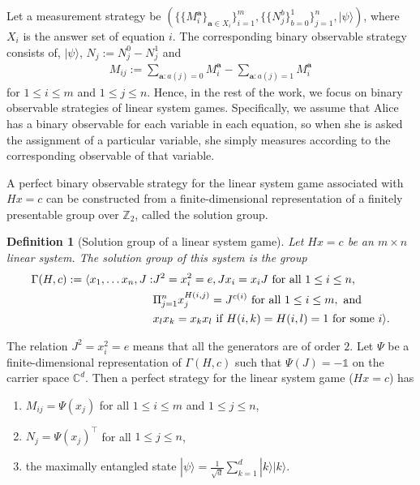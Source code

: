 \documentclass[11pt,letterpaper]{article}
\newcommand{\ket}[1]{|#1\rangle}
\newcommand{\tp}{^\intercal}
\DeclarePairedDelimiter{\ip}{\langle}{\rangle}
\newcommand{\C}{\mathbb{C}}
\newcommand{\Z}{\mathbb{Z}}
\newcommand{\1}{\mathbb{1}}
\newcommand{\ba}{\pmb{a}}
\newcommand{\sd}{\sqrt{d}}
\newtheorem{definition}[theorem]{Definition}
\theoremstyle{definition}
\begin{document}
Let a measurement strategy be 
$(\{\{M_i^{\ba}\}_{\ba \in X_i}\}_{i=1}^m, \{\{N_j^b\}_{b=0}^1\}_{j=1}^n, \ket{\psi})$, 
where $X_i$ is the answer set of equation $i$.
The corresponding binary observable
strategy consists of, $\ket{\psi}$, $N_j := N_j^0 - N_j^1$ and
\begin{align*}
    M_{ij} := \sum_{\ba: a(j)=0} M_i^{\ba} - \sum_{\ba: a(j) =1}
    M_i^{\ba}
\end{align*}
for $1\leq i \leq m$ and $1 \leq j \leq n$. 
Hence, in the rest of the work, we focus on binary observable strategies of linear system games.
Specifically, we assume that Alice has a binary observable for each variable
in each equation,
so when she is asked the assignment of a particular variable, she simply
measures according to the corresponding observable of that variable.


A perfect binary observable strategy for the linear system game associated with $Hx = c$ can be constructed from
a finite-dimensional representation of a finitely presentable group
over $\Z_2$, called the solution group. 
\begin{definition}[Solution group of a linear system game]
	\label{def:presentation}
	Let $Hx = c$ be an $m \times n$ linear system. The solution group of this system
	is the group
	\begin{align*}
		\Gamma(H,c) := \ip{
		x_1,\dots x_n, J: &J^2 = x_i^2 = e, Jx_i = x_iJ \text{ for all }1 \leq i \leq n, \\
				& \Pi_{j=1}^n x_j^{H(i,j)} = J^{c(i)} \text{ for all } 1 \leq i \leq m, \text{ and } \\
				& x_l x_k = x_k x_l \text{ if } H(i,k) = H(i,l) = 1 \text{ for some } i
				}.
	\end{align*}
\end{definition}
The relation $J^2 = x_i^2 = e$ means that all the generators are of order $2$.
Let $\Psi$ be a finite-dimensional representation of $\Gamma(H, c)$ such that $\Psi(J) = -\1$ on the carrier space $\C^d$. 
Then a perfect strategy for 
the linear system game ($Hx = c$) has
\begin{enumerate}
	\item $M_{ij} = \Psi(x_j)$ for all $ 1 \leq i \leq m$ and $1 \leq j \leq n$,
	\item $N_j = \Psi(x_j)\tp$ for all $1 \leq j \leq n$, 
	\item the maximally entangled state $\ket{\psi} = \frac{1}{\sd} \sum_{k=1}^d \ket{k}\ket{k}$.
\end{enumerate}
\end{document}
